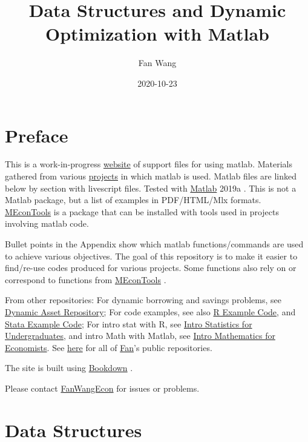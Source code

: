 \documentclass[
]{book}
\title{Data Structures and Dynamic Optimization with Matlab}
\author{Fan Wang}
\date{2020-10-23}
\begin{document}
\maketitle

{
\hypersetup{linkcolor=}
\setcounter{tocdepth}{2}
\tableofcontents
}
\hypertarget{preface}{%
\chapter*{Preface}\label{preface}}

This is a work-in-progress \href{https://fanwangecon.github.io/M4Econ/}{website} of support files for using matlab. Materials gathered from various \href{https://fanwangecon.github.io/research}{projects} in which matlab is used. Matlab files are linked below by section with livescript files. Tested with \href{https://www.mathworks.com/products/matlab.html}{Matlab} 2019a \citep{matlab}. This is not a Matlab package, but a list of examples in PDF/HTML/Mlx formats. \href{https://github.com/FanWangEcon/MEconTools}{MEconTools} is a package that can be installed with tools used in projects involving matlab code.

Bullet points in the Appendix show which matlab functions/commands are used to achieve various objectives. The goal of this repository is to make it easier to find/re-use codes produced for various projects. Some functions also rely on or correspond to functions from \href{https://github.com/FanWangEcon/MEconTools}{MEconTools} \citep{M-MEconTools}.

From other repositories: For dynamic borrowing and savings problems, see \href{https://fanwangecon.github.io/CodeDynaAsset/}{Dynamic Asset Repository}; For code examples, see also \href{https://fanwangecon.github.io/R4Econ/}{R Example Code}, and \href{https://fanwangecon.github.io/Stata4Econ/}{Stata Example Code}; For intro stat with R, see \href{https://fanwangecon.github.io/Stat4Econ/}{Intro Statistics for Undergraduates}, and intro Math with Matlab, see \href{https://fanwangecon.github.io/Math4Econ/}{Intro Mathematics for Economists}. See \href{https://github.com/FanWangEcon}{here} for all of \href{https://fanwangecon.github.io/}{Fan}'s public repositories.

The site is built using \href{https://bookdown.org/}{Bookdown} \citep{R-bookdown}.

Please contact \href{https://fanwangecon.github.io/}{FanWangEcon} for issues or problems.

\hypertarget{data-structures}{%
\chapter{Data Structures}\label{data-structures}}
\end{document}
